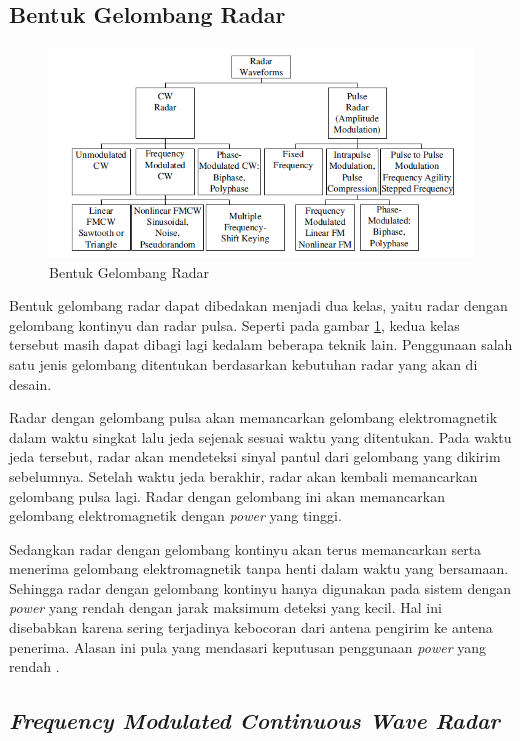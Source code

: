 \subsection{Bentuk Gelombang Radar}
\begin{figure}
	\begin{center}
		\includegraphics[scale=0.8]{pics/bab2/radarwaveform.png}
		\caption[Bentuk Gelombang Radar]{Bentuk Gelombang Radar \cite{Melvin2014}}
		\label{pic:bentukgelradar}
	\end{center}
\end{figure}
Bentuk gelombang radar dapat dibedakan menjadi dua kelas, yaitu radar dengan gelombang kontinyu dan radar pulsa. Seperti pada gambar \ref{pic:bentukgelradar}, kedua kelas tersebut masih dapat dibagi lagi kedalam beberapa teknik lain. Penggunaan salah satu jenis gelombang ditentukan berdasarkan kebutuhan radar yang akan di desain. 

Radar dengan gelombang pulsa akan memancarkan gelombang elektromagnetik dalam waktu singkat lalu jeda sejenak sesuai waktu yang ditentukan. Pada waktu jeda tersebut, radar akan mendeteksi sinyal pantul dari gelombang yang dikirim sebelumnya. Setelah waktu jeda berakhir, radar akan kembali memancarkan gelombang pulsa lagi. Radar dengan gelombang ini akan memancarkan gelombang elektromagnetik dengan \textit{power} yang tinggi. 

Sedangkan radar dengan gelombang kontinyu akan terus memancarkan serta menerima gelombang elektromagnetik tanpa henti dalam waktu yang bersamaan. Sehingga radar dengan gelombang kontinyu hanya digunakan pada sistem dengan \textit{power} yang rendah dengan jarak maksimum deteksi yang kecil. Hal ini disebabkan karena sering terjadinya kebocoran dari antena pengirim ke antena penerima. Alasan ini pula yang mendasari keputusan penggunaan \textit{power} yang rendah \cite{Scheer2015}.

\subsection{\textit{Frequency Modulated Continuous Wave Radar}}

